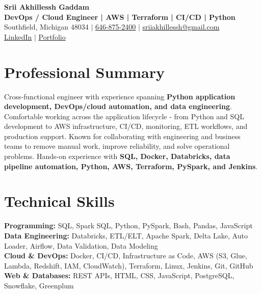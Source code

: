 \documentclass[letterpaper,10pt]{article}
\begin{document}
\fontsize{9.35pt}{10.45pt}\selectfont

\begin{center}
    {\LARGE \textbf{Srii Akhillessh Gaddam}} \\[-1pt]
    \textbf{DevOps / Cloud Engineer | AWS | Terraform | CI/CD | Python} \\[2pt]
    Southfield, Michigan 48034 $|$
    \href{tel:6468752400}{646-875-2400} $|$
    \href{mailto:sriiakhillessh@gmail.com}{sriiakhillessh@gmail.com} \\[1pt]
    \href{https://www.linkedin.com/in/srii-akhiilessh-gaddam-b48668191/}{LinkedIn} $|$
    \href{https://sriiakhillesshg.github.io/portfolio/}{Portfolio}
\end{center}
\vspace{-8pt}

\section{Professional Summary}
\small{Cross-functional engineer with experience spanning \textbf{Python application development, DevOps/cloud automation, and data engineering}. Comfortable working across the application lifecycle - from Python and SQL development to AWS infrastructure, CI/CD, monitoring, ETL workflows, and production support. Known for collaborating with engineering and business teams to remove manual work, improve reliability, and solve operational problems. Hands-on experience with \textbf{SQL, Docker, Databricks, data pipeline automation, Python, AWS, Terraform, PySpark, and Jenkins}.}

\section{Technical Skills}
\small{
\textbf{Programming:} SQL, Spark SQL, Python, PySpark, Bash, Pandas, JavaScript \\
\textbf{Data Engineering:} Databricks, ETL/ELT, Apache Spark, Delta Lake, Auto Loader, Airflow, Data Validation, Data Modeling \\
\textbf{Cloud \& DevOps:} Docker, CI/CD, Infrastructure as Code, AWS (S3, Glue, Lambda, Redshift, IAM, CloudWatch), Terraform, Linux, Jenkins, Git, GitHub \\
\textbf{Web \& Databases:} REST APIs, HTML, CSS, JavaScript, PostgreSQL, Snowflake, Greenplum
}
\end{document}
